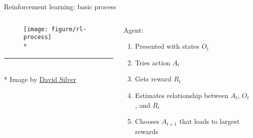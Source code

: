 \documentclass{beamer}
\begin{document}
\begin{frame}[fragile]{Reinforcement learning: basic process}
\begin{columns}
  \begin{column}{0.6\textwidth}
  \begin{figure}[H]
    \centering 
    \texttt{[image: figure/rl-process]} \\*
  \end{figure}
  \vspace{-0.6cm}
  \rule{5cm}{0.2pt} \\*
  \vspace{-6pt}
  {\footnotesize \quad Image by \href{http://www0.cs.ucl.ac.uk/staff/D.Silver/web/Teaching.html}{David Silver}}
  \end{column}
  \begin{column}{0.5\textwidth}
    Agent:
    \begin{enumerate}
      \item Presented with states $O_{t}$
      \item Tries action $A_{t}$
      \item Gets reward $R_{t}$
      \item Estimates relationship between $A_{t}$, $O_{t}$, and $R_{t}$
      \item Chooses $A_{t+1}$ that leads to largest rewards
    \end{enumerate}
  \end{column}
\end{columns}
\end{frame}

%
%
%




%
%
\end{document}

